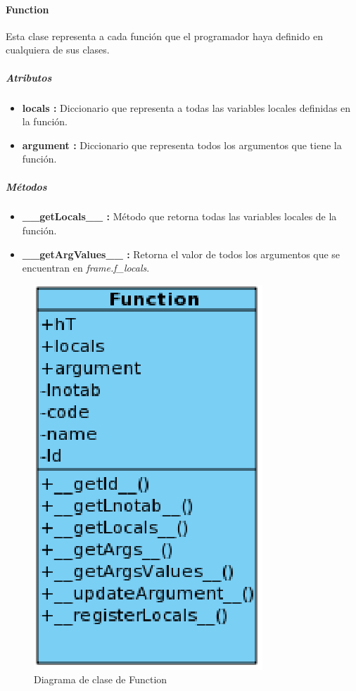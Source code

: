 \documentclass[12pt,legalpaper]{report}
\begin{document}
				\paragraph{Function}

Esta clase representa a cada función que el programador haya definido en cualquiera de sus clases.				
				
					\subparagraph{Atributos}
					
\begin{itemize}
	\item \textbf{locals :} Diccionario que representa a todas las variables locales definidas en la función.
	\item \textbf{argument :} Diccionario que representa todos los argumentos que tiene la función.
\end{itemize}					
					
					\subparagraph{Métodos}						
					
\begin{itemize}
	\item \textbf{\_\_getLocals\_\_ :} Método que retorna todas las variables locales de la función.
	\item \textbf{\_\_getArgValues\_\_ :} Retorna el valor de todos los argumentos que se encuentran en \textit{frame.f\_locals}.
\end{itemize}					
					
				
\begin{figure}[!h]
	\centering
	\includegraphics[scale=0.6]{images/Clases/Function.eps}
	\caption{Diagrama de clase de Function}
\end{figure}
					
\end{document}
